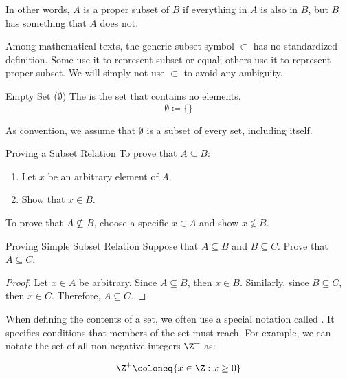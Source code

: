 In other words, $A$ is a proper subset of $B$ if everything in $A$ is also in $B$, but $B$ has something that $A$ does not.

\begin{notebox}
    Among mathematical texts, the generic subset symbol $\subset$ has no standardized definition. Some use it to represent subset or equal; others use it to represent proper subset. We will simply not use $\subset$ to avoid any ambiguity.
\end{notebox}

\begin{dfnbox}{Empty Set ($\emptyset$)}{}
    The  is the set that contains no elements.
    \tcblower
    \[ \emptyset \coloneq \{ \} \]
\end{dfnbox}

As convention, we assume that $\emptyset$ is a subset of every set, including itself.


\begin{tecbox}{Proving a Subset Relation}{}
    To prove that $A \subseteq B$:
    \begin{enumerate}
        \item Let $x$ be an arbitrary element of $A$.
        \item Show that $x \in B$.
    \end{enumerate}
    \tcblower
    To prove that $A \not\subseteq B$, choose a specific $x \in A$ and show $x \notin B$.
\end{tecbox}

\begin{exbox}{Proving Simple Subset Relation}{}
    Suppose that $A \subseteq B$ and $B \subseteq C$. Prove that $A \subseteq C$.
    \tcblower
    \begin{proof}
        Let $x \in A$ be arbitrary. Since $A \subseteq B$, then $x \in B$. Similarly, since $B \subseteq C$, then $x \in C$. Therefore, $A \subseteq C$.
    \end{proof}
\end{exbox}

When defining the contents of a set, we often use a special notation called . It specifies conditions that members of the set must reach. For example, we can notate the set of all non-negative integers $\Z^+$ as:

\[ \Z^+ \coloneq \{ x \in \Z : x \geq 0 \} \]

